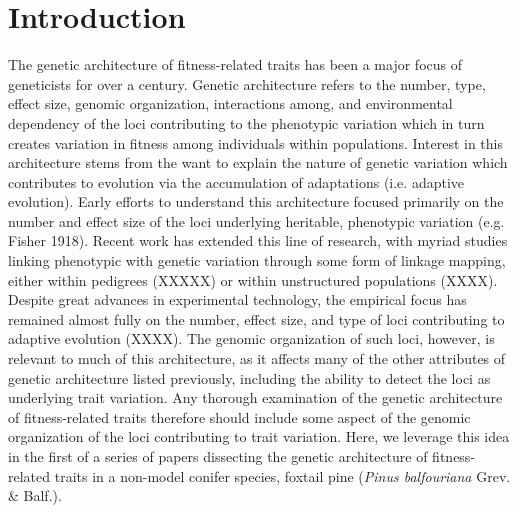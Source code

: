 \documentclass[11pt]{article}
\begin{document}
\section{Introduction}
The genetic architecture of fitness-related traits has been a major focus of geneticists for over a century. 
Genetic architecture refers to the number, type, effect size, genomic organization, 
interactions among, and environmental dependency 
of the loci contributing to the phenotypic variation which in turn creates variation in fitness among 
individuals within populations.
Interest in this architecture stems from the want to explain the nature of 
genetic variation which contributes to evolution 
via the accumulation of adaptations (i.e. adaptive evolution). Early efforts to understand 
this architecture focused primarily on the number and effect size of the loci underlying heritable, 
phenotypic variation (e.g. Fisher 1918). 
Recent work has extended this line of research, with myriad studies linking 
phenotypic with genetic variation through 
some form of linkage mapping, either within pedigrees (XXXXX) or within unstructured populations (XXXX). 
Despite great advances in experimental technology, the empirical focus has remained almost 
fully on the number, effect size, and type of loci
contributing to adaptive evolution (XXXX). The genomic organization of such loci, 
however, is relevant to much of this architecture, as 
it affects many of the other attributes of genetic architecture listed previously, 
including the ability to detect the loci as underlying trait variation. 
Any thorough examination of the genetic architecture of fitness-related traits 
therefore should include some aspect of the genomic organization of the loci
contributing to trait variation. Here, we leverage this idea in the first of a series of papers 
dissecting the genetic architecture of fitness-related
traits in a non-model conifer species, foxtail pine (\textit{Pinus balfouriana} Grev. \& Balf.).
\end{document}
